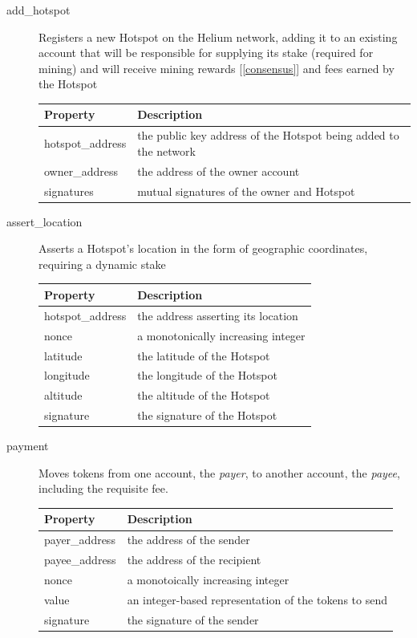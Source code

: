 \documentclass[10pt, nonatbib, nocopyrightspace, reprint]{sigplanconf}
\newcommand{\secref}[1]{[\autoref{#1}]}
\begin{document}
\begin{description}
  \item [add\_hotspot] Registers a new Hotspot on the Helium network, adding it to an existing account that will be responsible for supplying its stake (required for mining) and will receive mining rewards \secref{consensus} and fees earned by the Hotspot

\begin{table}[H]
  \centering
  \begin{tabularx}{\columnwidth}{l X}
    \toprule
    Property & Description \\ \midrule
    hotspot\_address & the public key address of the Hotspot being added to the network \\
    owner\_address & the address of the owner account \\
    signatures & mutual signatures of the owner and Hotspot
  \end{tabularx}
\end{table}

\item [assert\_location] Asserts a Hotspot's location in the form of geographic coordinates, requiring a dynamic stake

\begin{table}[H]
  \centering
  \begin{tabularx}{\columnwidth}{l X}
      \toprule
      Property & Description \\ \midrule
      hotspot\_address & the address asserting its location \\
      nonce & a monotonically increasing integer \\
      latitude & the latitude of the Hotspot \\
      longitude & the longitude of the Hotspot \\
      altitude & the altitude of the Hotspot \\
      signature & the signature of the Hotspot
  \end{tabularx}
\end{table}

\item [payment] \label{payment} Moves tokens from one account, the \emph{payer}, to another account, the \emph{payee}, including the requisite fee.

\begin{table}[H]
  \centering
  \begin{tabularx}{\columnwidth}{l X}
      \toprule
      Property & Description \\ \midrule
      payer\_address & the address of the sender \\
      payee\_address & the address of the recipient \\
      nonce & a monotoically increasing integer \\
      value & an integer-based representation of the tokens to send \\
      signature & the signature of the sender
  \end{tabularx}
\end{table}

\end{description}
\end{document}
